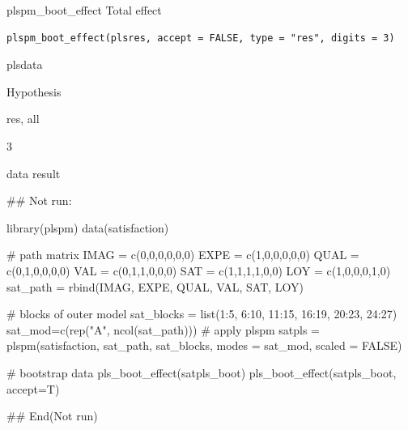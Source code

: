 \documentclass[a4paper]{book}
\begin{document}
%
\begin{Description}
plspm\_boot\_effect Total effect
\end{Description}
%
\begin{Usage}
\begin{verbatim}
plspm_boot_effect(plsres, accept = FALSE, type = "res", digits = 3)
\end{verbatim}
\end{Usage}
%
\begin{Arguments}
\begin{ldescription}
\item[\code{plsres}] plsdata

\item[\code{accept}] Hypothesis

\item[\code{type}] res, all

\item[\code{digits}] 3
\end{ldescription}
\end{Arguments}
%
\begin{Value}
data result
\end{Value}
%
\begin{Examples}
\begin{ExampleCode}

\#\# Not run: 

library(plspm)
data(satisfaction)

# path matrix
IMAG = c(0,0,0,0,0,0)
EXPE = c(1,0,0,0,0,0)
QUAL = c(0,1,0,0,0,0)
VAL = c(0,1,1,0,0,0)
SAT = c(1,1,1,1,0,0)
LOY = c(1,0,0,0,1,0)
sat_path = rbind(IMAG, EXPE, QUAL, VAL, SAT, LOY)

# blocks of outer model
sat_blocks = list(1:5, 6:10, 11:15, 16:19, 20:23, 24:27)
sat_mod=c(rep("A", ncol(sat_path)))
# apply plspm
satpls = plspm(satisfaction, sat_path, sat_blocks, modes = sat_mod,
               scaled = FALSE)



  # bootstrap data
pls_boot_effect(satpls_boot)
pls_boot_effect(satpls_boot, accept=T)


## End(Not run)

\end{ExampleCode}
\end{Examples}
\end{document}
